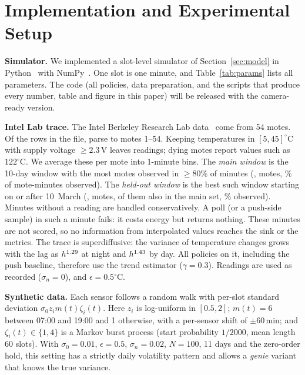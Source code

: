 \documentclass[conference]{IEEEtran}
\begin{document}
\section{Implementation and Experimental Setup}\label{sec:setup}
\textbf{Simulator.} We implemented a slot-level simulator of
Section~\ref{sec:model} in Python~\PyVer{} with NumPy~\NpVer. One slot is one
minute, and Table~\ref{tab:params} lists all parameters. The code (all policies,
data preparation, and the scripts that produce every number, table and figure in
this paper) will be released with the camera-ready version.



\textbf{Intel Lab trace.} The Intel Berkeley Research Lab data~\cite{intellab2004}
come from 54 motes. Of the \IntelRows{} rows in the file, \IntelParsed{} parse to
motes 1--54. Keeping temperatures in $[5,45]^\circ$C with supply voltage
$\ge2.3$\,V leaves \IntelClean{} readings; dying motes report values such as
$122^\circ$C. We average these per mote into 1-minute bins. The \emph{main window}
is the 10-day window with the most motes observed in $\ge80\%$ of minutes
(\IntelStart, \IntelMotes{} motes, \IntelObs\% of mote-minutes observed). The
\emph{held-out window} is the best such window starting on or after 10~March
(\HoStart, \HoMotes{} motes, \HoShared{} of them also in the main set,
\HoObs\% observed). Minutes without a reading are handled conservatively. A poll
(or a push-side sample) in such a minute fails: it costs energy but returns
nothing. These minutes are not scored, so no information from interpolated values
reaches the sink or the metrics. The
trace is superdiffusive: the variance of temperature changes grows with the lag
as $h^{1.29}$ at night and $h^{1.43}$ by day. All policies on it,
including the push baseline, therefore use the trend estimator
($\gamma=0.3$). Readings are used as recorded ($\sigma_n=0$), and
$\epsilon=0.5^\circ$C.

\textbf{Synthetic data.} Each sensor follows a random walk with per-slot standard
deviation $\sigma_0 z_i m(t)\zeta_i(t)$. Here $z_i$ is log-uniform in $[0.5,2]$;
$m(t)=6$ between 07:00 and 19:00 and 1 otherwise, with a per-sensor shift of
$\pm60$\,min; and $\zeta_i(t)\in\{1,4\}$ is a Markov burst process (start
probability $1/2000$, mean length 60 slots). With $\sigma_0=0.01$, $\epsilon=0.5$,
$\sigma_n=0.02$, $N=100$, 11 days and the zero-order hold, this setting has a
strictly daily volatility pattern and allows a \emph{genie} variant that knows
the true variance.
\end{document}
